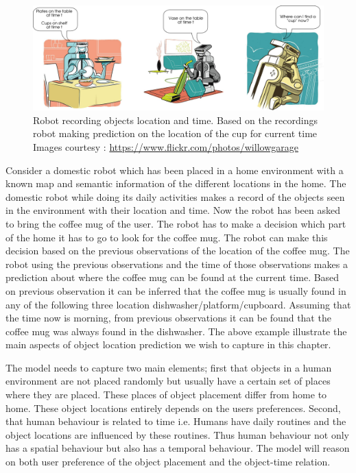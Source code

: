 \begin{figure}[htp]
\centering
\includegraphics[scale=0.4]{pictures/scenario.png}
\caption[Example scenario of robot recording objects location and time]{Robot recording objects location and time. Based on the
recordings robot making prediction on the location of the cup for current time
Images courtesy : \url{https://www.flickr.com/photos/willowgarage} }
\label{scenario}
\end{figure}

Consider a domestic robot which has been placed in a home environment with a known map
and semantic information of the different locations in the home. The domestic robot while doing its daily activities 
makes a record of the objects seen in the environment with
their location and time. Now the robot has been asked to bring the coffee mug
of the user.
The robot has to make a decision which part of the home it has to go to look for
the coffee mug.
The robot can make this decision based on the previous observations of the 
location of the coffee mug.
The robot using the previous observations and the time of those observations 
makes a prediction about where the coffee mug can be found at the current time.
Based on previous observation it can be
inferred that the coffee mug is usually found in any of the following three location
dishwasher/platform/cupboard. Assuming that the time now is morning, from
previous observations it can be found that the coffee mug was always found  in the
dishwasher. The above example illustrate the main aspects of object location
prediction we wish to capture in this chapter.


The model needs to capture two main
elements; first that objects in a human environment are not placed randomly but
usually have a certain set of places where they are placed.
These places of object placement differ from home
to home. These object locations entirely depends on the users preferences.  
Second, that human behaviour is related to time i.e. Humans have daily routines  and the object locations are influenced by these routines.
Thus human behaviour not only  has a spatial behaviour but also has a temporal behaviour.
The model will reason on both user preference of the object placement and the
object-time relation.


